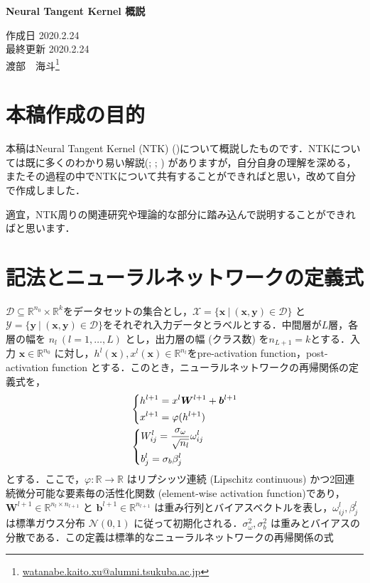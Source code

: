 \documentclass[a4paper]{bxjsarticle}
\makeatletter
\newcommand{\mytitle}{Neural Tangent Kernel 概説}
\newcommand{\myhead}{
\begin{center}%
\textbf{\LARGE\mytitle}%
\end{center}%
\vspace{0.7em}
\begin{flushright}%
作成日 2020.2.24\\%
最終更新 2020.2.24\\%
渡部　海斗\footnote{\protect\url{watanabe.kaito.xu@alumni.tsukuba.ac.jp}}%
\end{flushright}}
\theoremstyle{definition}
\makeatother
\begin{document}
\myhead

\section{本稿作成の目的}
本稿はNeural Tangent Kernel (NTK) (\citealp{jacot2018neural})について概説したものです．NTKについては既に多くのわかり易い解説(\citealp{rajat2019ntk}; \citealp{甘利俊一2019情報幾何学の新展開}; \citealp{TaijiSuzuki2019theory}) がありますが，自分自身の理解を深める，またその過程の中でNTKについて共有することができればと思い，改めて自分で作成しました．

適宜，NTK周りの関連研究や理論的な部分に踏み込んで説明することができればと思います．

\section{記法とニューラルネットワークの定義式}
\label{notation}
$\mathcal{D} \subseteq \mathbb{R}^{n_0} \times \mathbb{R}^{k}$をデータセットの集合とし，$\mathcal{X}=\{\bm{x} \ | \ (\bm{x},\bm{y}) \in \mathcal{D}\}$ と $\mathcal{Y}=\{\bm{y} \ | \ (\bm{x},\bm{y}) \in \mathcal{D}\}$をそれぞれ入力データとラベルとする．中間層が$L$層，各層の幅を $n_l  \ (l=1,\ldots,L)$ とし，出力層の幅 (クラス数) を$n_{L+1}=k$とする．入力 $\bm{x} \in \mathbb{R}^{n_0}$ に対し，$h^{l}(\bm{x}), x^{l}(\bm{x}) \in \mathbb{R}^{n_l}$をpre-activation function，post-activation function とする．このとき，ニューラルネットワークの再帰関係の定義式を，
\begin{align}
    &\begin{dcases}
        h^{l+1} = x^{l}\bm{W}^{l+1} + \bm{b}^{l+1} \\
        x^{l+1} = \varphi(h^{l+1})
    \end{dcases}
    \\
    &\begin{dcases}
        W_{ij}^{l} = \dfrac{\sigma_{\omega}}{\sqrt{n_l}}\omega_{ij}^{l} \\
        b_{j}^{l} = \sigma_b \beta_{j}^{l}
    \end{dcases}
\end{align}
とする．ここで，$\varphi:\mathbb{R} \rightarrow \mathbb{R}$ はリプシッツ連続 (Lipschitz continuous) かつ2回連続微分可能な要素毎の活性化関数 (element-wise activation function)であり，$\bm{W}^{l+1} \in \mathbb{R}^{n_{l} \times n_{l+1}}$ と $\bm{b}^{l+1} \in \mathbb{R}^{n_{l+1}}$ は重み行列とバイアスベクトルを表し，$\omega_{ij}^{l},\beta_{j}^{l}$ は標準ガウス分布 $\mathcal{N}(0, 1)$ に従って初期化される．$\sigma_{\omega}^2, \sigma_{b}^2$ は重みとバイアスの分散である．この定義は標準的なニューラルネットワークの再帰関係の式
\end{document}
